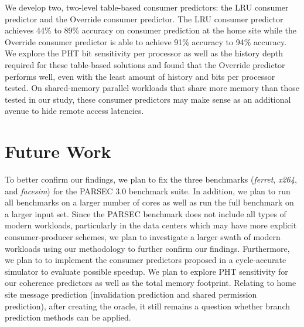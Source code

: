     We develop two, two-level table-based consumer predictors: the LRU consumer predictor and the Override consumer predictor. The LRU consumer predictor achieves 44\% to 89\% accuracy on consumer prediction at the home site while the Override consumer predictor is able to achieve 91\% accuracy to 94\% accuracy. We explore the PHT bit sensitivity per processor as well as the history depth required for these table-based solutions and found that the Override predictor performs well, even with the least amount of history and bits per processor tested. On shared-memory parallel workloads that share more memory than those tested in our study, these consumer predictors may make sense as an additional avenue to hide remote access latencies.
    
\section{Future Work}
    To better confirm our findings, we plan to fix the three benchmarks (\textit{ferret}, \textit{x264}, and \textit{facesim}) for the PARSEC 3.0 benchmark suite. In addition, we plan to run all benchmarks on a larger number of cores as well as run the full benchmark on a larger input set. Since the PARSEC benchmark does not include all types of modern workloads, particularly in the data centers which may have more explicit consumer-producer schemes, we plan to investigate a larger swath of modern workloads using our methodology to further confirm our findings. Furthermore, we plan to to implement the consumer predictors proposed in a cycle-accurate simulator to evaluate possible speedup. We plan to explore PHT sensitivity for our coherence predictors as well as the total memory footprint. Relating to home site message prediction (invalidation prediction and shared permission prediction), after creating the oracle, it still remains a question whether branch prediction methods can be applied. 

